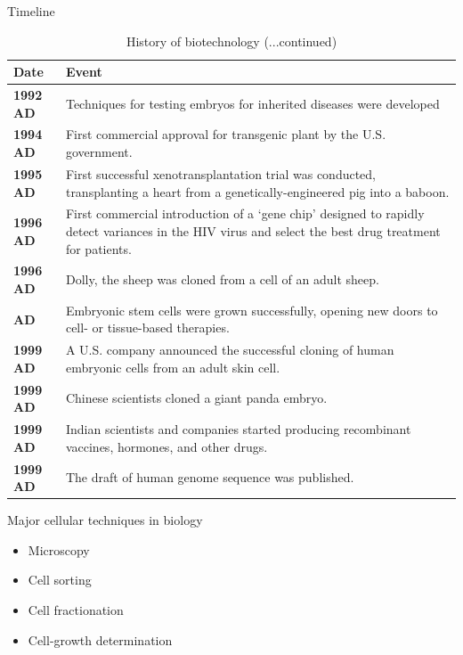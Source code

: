 \documentclass[ignorenonframetext,aspectratio=169]{beamer}
\providecommand{\tightlist}{%
  \setlength{\itemsep}{0pt}\setlength{\parskip}{0pt}}
\begin{document}
\begin{frame}{Timeline}
\protect\hypertarget{timeline-2}{}

\begin{table}[t]

\caption{\label{tab:biotechnology-history3}History of biotechnology (...continued)}
\centering
\fontsize{5}{7}\selectfont
\begin{tabular}{>{\bfseries}l>{\raggedright\arraybackslash}p{40em}}
\toprule
Date & Event\\
\midrule
\rowcolor{gray!6}  1992 AD & Techniques for testing embryos for inherited diseases were developed\\
1994 AD & First commercial approval for transgenic plant by the U.S. government.\\
\rowcolor{gray!6}  1995 AD & First successful xenotransplantation trial was conducted, transplanting a heart from a genetically-engineered pig into a baboon.\\
1996 AD & First commercial introduction of a ‘gene chip’ designed to rapidly detect variances in the HIV virus and select the best drug treatment for patients.\\
\rowcolor{gray!6}  1996 AD & Dolly, the sheep was cloned from a cell of an adult sheep.\\
\addlinespace
1998 AD & Embryonic stem cells were grown successfully, opening new doors to cell- or tissue-based therapies.\\
\rowcolor{gray!6}  1999 AD & A U.S. company announced the successful cloning of human embryonic cells from an adult skin cell.\\
1999 AD & Chinese scientists cloned a giant panda embryo.\\
\rowcolor{gray!6}  1999 AD & Indian scientists and companies started producing recombinant vaccines, hormones, and other drugs.\\
1999 AD & The draft of human genome sequence was published.\\
\bottomrule
\end{tabular}
\end{table}

\end{frame}

\begin{frame}{Major cellular techniques in biology}
\protect\hypertarget{major-cellular-techniques-in-biology}{}

\begin{itemize}
\tightlist
\item
  Microscopy
\item
  Cell sorting
\item
  Cell fractionation
\item
  Cell-growth determination
\end{itemize}

\end{frame}
\end{document}
